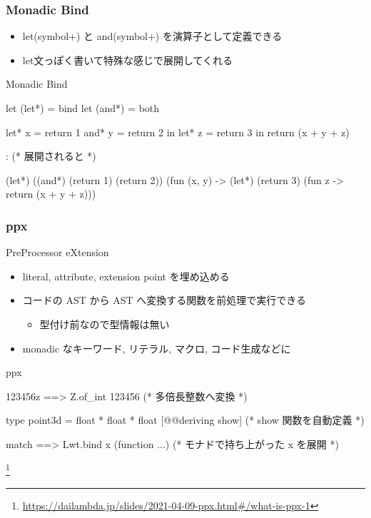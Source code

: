 \documentclass[dvipdfmx,14pt,notheorems,aspectratio=169]{beamer}
\theoremstyle{definition}
\begin{document}
    \begin{frame}[fragile]\frametitle{Monadic Bind}
        \begin{itemize}
            \item let(symbol+) と and(symbol+) を演算子として定義できる
            \item let文っぽく書いて特殊な感じで展開してくれる
        \end{itemize}
        \begin{exampleblock}{Monadic Bind}
            \scriptsize
            \begin{verbatimtab}
let (let*) = bind
let (and*) = both

let* x = return 1 and* y = return 2 in
let* z = return 3 in
return (x + y + z)

 : (* 展開されると *)

(let*) ((and*) (return 1) (return 2)) (fun (x, y) ->
(let*) (return 3) (fun z ->
return (x + y + z)))\end{verbatimtab}
        \end{exampleblock}
    \end{frame}


    \begin{frame}[fragile]\frametitle{ppx}
        PreProcessor eXtension
        \begin{itemize}
            \item literal, attribute, extension point を埋め込める
            \item コードの AST から AST へ変換する関数を前処理で実行できる
            \begin{itemize}
                \item 型付け前なので型情報は無い
            \end{itemize}
            \item monadic なキーワード, リテラル, マクロ, コード生成などに
        \end{itemize}
        \begin{exampleblock}{ppx}
            \scriptsize
            \begin{verbatimtab}
123456z ==> Z.of_int 123456 (* 多倍長整数へ変換 *)

type point3d = float * float * float
[@@deriving show] (* show 関数を自動定義 *)

match%
==> Lwt.bind x (function ...) (* モナドで持ち上がった x を展開 *)
            \end{verbatimtab}
        \end{exampleblock}
        \footnote{\url{https://dailambda.jp/slides/2021-04-09-ppx.html\#/what-is-ppx-1}}
    \end{frame}
\end{document}
